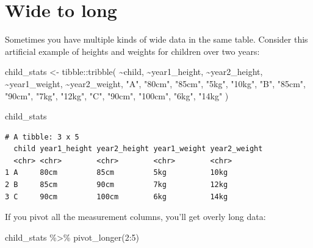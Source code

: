 \documentclass[
  letterpaper,
  DIV=11,
  numbers=noendperiod]{scrreprt}
\newenvironment{Shaded}{\begin{snugshade}}{\end{snugshade}}
\newcommand{\DecValTok}[1]{\textcolor[rgb]{0.68,0.00,0.00}{#1}}
\newcommand{\FunctionTok}[1]{\textcolor[rgb]{0.28,0.35,0.67}{#1}}
\newcommand{\NormalTok}[1]{\textcolor[rgb]{0.00,0.23,0.31}{#1}}
\newcommand{\OtherTok}[1]{\textcolor[rgb]{0.00,0.23,0.31}{#1}}
\newcommand{\SpecialCharTok}[1]{\textcolor[rgb]{0.37,0.37,0.37}{#1}}
\newcommand{\StringTok}[1]{\textcolor[rgb]{0.13,0.47,0.30}{#1}}
\begin{document}
\hypertarget{wide-to-long}{%
\section{Wide to long}\label{wide-to-long}}

Sometimes you have multiple kinds of wide data in the same table.
Consider this artificial example of heights and weights for children
over two years:

\begin{Shaded}
\begin{Highlighting}[]
\NormalTok{child\_stats }\OtherTok{\textless{}{-}} 
\NormalTok{  tibble}\SpecialCharTok{::}\FunctionTok{tribble}\NormalTok{(}
    \SpecialCharTok{\textasciitilde{}}\NormalTok{child, }\SpecialCharTok{\textasciitilde{}}\NormalTok{year1\_height, }\SpecialCharTok{\textasciitilde{}}\NormalTok{year2\_height, }\SpecialCharTok{\textasciitilde{}}\NormalTok{year1\_weight, }\SpecialCharTok{\textasciitilde{}}\NormalTok{year2\_weight,}
       \StringTok{"A"}\NormalTok{,        }\StringTok{"80cm"}\NormalTok{,        }\StringTok{"85cm"}\NormalTok{,         }\StringTok{"5kg"}\NormalTok{,        }\StringTok{"10kg"}\NormalTok{,}
       \StringTok{"B"}\NormalTok{,        }\StringTok{"85cm"}\NormalTok{,        }\StringTok{"90cm"}\NormalTok{,         }\StringTok{"7kg"}\NormalTok{,        }\StringTok{"12kg"}\NormalTok{,}
       \StringTok{"C"}\NormalTok{,        }\StringTok{"90cm"}\NormalTok{,       }\StringTok{"100cm"}\NormalTok{,         }\StringTok{"6kg"}\NormalTok{,        }\StringTok{"14kg"}
\NormalTok{    )}

\NormalTok{child\_stats}
\end{Highlighting}
\end{Shaded}

\begin{verbatim}
# A tibble: 3 x 5
  child year1_height year2_height year1_weight year2_weight
  <chr> <chr>        <chr>        <chr>        <chr>       
1 A     80cm         85cm         5kg          10kg        
2 B     85cm         90cm         7kg          12kg        
3 C     90cm         100cm        6kg          14kg        
\end{verbatim}

If you pivot all the measurement columns, you'll get overly long data:

\begin{Shaded}
\begin{Highlighting}[]
\NormalTok{child\_stats }\SpecialCharTok{\%\textgreater{}\%} 
  \FunctionTok{pivot\_longer}\NormalTok{(}\DecValTok{2}\SpecialCharTok{:}\DecValTok{5}\NormalTok{)}
\end{Highlighting}
\end{Shaded}
\end{document}
